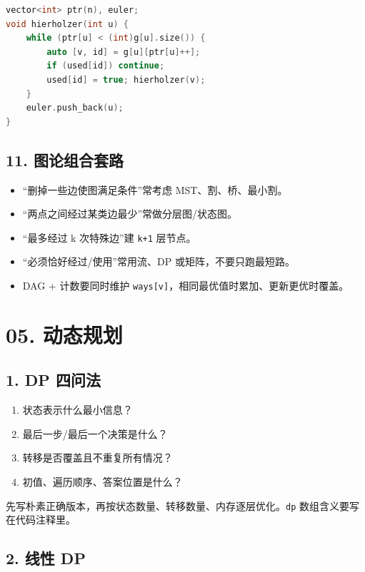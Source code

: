 \begin{lstlisting}[language={C++}]
vector<int> ptr(n), euler;
void hierholzer(int u) {
    while (ptr[u] < (int)g[u].size()) {
        auto [v, id] = g[u][ptr[u]++];
        if (used[id]) continue;
        used[id] = true; hierholzer(v);
    }
    euler.push_back(u);
}
\end{lstlisting}

\section{11. 图论组合套路}\label{ux56feux8bbaux7ec4ux5408ux5957ux8def}

\begin{itemize}
\tightlist
\item
  ``删掉一些边使图满足条件''常考虑 MST、割、桥、最小割。
\item
  ``两点之间经过某类边最少''常做分层图/状态图。
\item
  ``最多经过 k 次特殊边''建 \passthrough{\lstinline!k+1!} 层节点。
\item
  ``必须恰好经过/使用''常用流、DP 或矩阵，不要只跑最短路。
\item
  DAG + 计数要同时维护 \passthrough{\lstinline!ways[v]!}，相同最优值时累加、更新更优时覆盖。
\end{itemize}

\chapter{05. 动态规划}\label{ux52a8ux6001ux89c4ux5212}

\section{1. DP 四问法}\label{dp-ux56dbux95eeux6cd5}

\begin{enumerate}
\def\labelenumi{\arabic{enumi}.}
\tightlist
\item
  状态表示什么最小信息？
\item
  最后一步/最后一个决策是什么？
\item
  转移是否覆盖且不重复所有情况？
\item
  初值、遍历顺序、答案位置是什么？
\end{enumerate}

先写朴素正确版本，再按状态数量、转移数量、内存逐层优化。\passthrough{\lstinline!dp!} 数组含义要写在代码注释里。

\section{2. 线性 DP}\label{ux7ebfux6027-dp}

